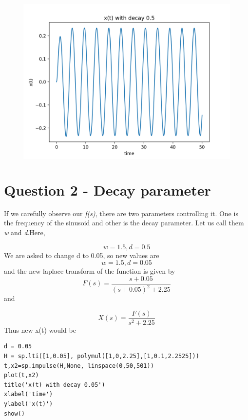 \documentclass[12pt, a4paper]{report}
\begin{document}
\begin{figure}[!tbh]
   	\centering
   	\includegraphics[scale=0.8]{Q1.png}
 \end{figure} 
 
 
 \section*{Question 2 - Decay parameter}

If we carefully observe our \textit{f(s)}, there are two parameters controlling it. One is the frequency of the sinusoid and other is the decay parameter. Let us call them \textit{w} and \textit{d}.Here,

\begin{equation}
  w = 1.5, d = 0.5 
\end{equation}
We are asked to change d to 0.05, so new values are
\begin{equation}
  	w = 1.5, d = 0.05 
\end{equation}
and the new laplace transform of the function is given by 
\begin{equation}
  	F(s)	= \frac{s+0.05}{(s+0.05)^2 + 2.25}
\end{equation}
and 

\begin{equation}
  	X(s) = \frac{F(s)}{s^2+ 2.25}
\end{equation}
Thus new x(t) would be
\begin{Verbatim}
d = 0.05
H = sp.lti([1,0.05], polymul([1,0,2.25],[1,0.1,2.2525]))
t,x2=sp.impulse(H,None, linspace(0,50,501))
plot(t,x2)
title('x(t) with decay 0.05')
xlabel('time')
ylabel('x(t)')
show()

\end{Verbatim}
\end{document}
